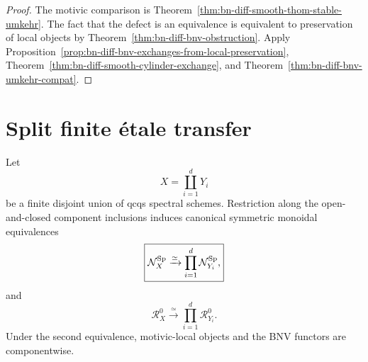 \begin{proof}
The motivic comparison is
Theorem~\ref{thm:bn-diff-smooth-thom-stable-umkehr}.  The fact that the defect is an equivalence
is equivalent to preservation of local objects by
Theorem~\ref{thm:bn-diff-bnv-obstruction}.  Apply
Proposition~\ref{prop:bn-diff-bnv-exchanges-from-local-preservation},
Theorem~\ref{thm:bn-diff-smooth-cylinder-exchange}, and
Theorem~\ref{thm:bn-diff-bnv-umkehr-compat}.
\end{proof}

\section{Split finite \texorpdfstring{\'etale}{etale} transfer}
\label{sec:bn-diff-split-finite-etale}

\begin{lemma}
\label{lem:bn-diff-disjoint-union-decomposition}
Let
\[
  X=\coprod_{i=1}^{d}Y_i
\]
be a finite disjoint union of qcqs spectral schemes.  Restriction along the
open-and-closed component inclusions induces canonical symmetric monoidal
equivalences
\[
  \boxed{
  \mathcal N_X^{\mathrm{Sp}}
  \xrightarrow{\simeq}
  \prod_{i=1}^{d}\mathcal N_{Y_i}^{\mathrm{Sp}},
  }
\]
and
\[
  \boxed{
  \mathcal R_X^0
  \xrightarrow{\simeq}
  \prod_{i=1}^{d}\mathcal R_{Y_i}^0.
  }
\]
Under the second equivalence, motivic-local objects and the BNV functors are
componentwise.
\end{lemma}

